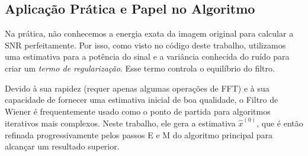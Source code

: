 \documentclass[12pt]{article}
\begin{document}
\subsection{Aplicação Prática e Papel no Algoritmo}

Na prática, não conhecemos a energia exata da imagem original para calcular a SNR perfeitamente. Por isso, como visto no código deste trabalho, utilizamos uma estimativa para a potência do sinal e a variância conhecida do ruído para criar um \textit{termo de regularização}. Esse termo controla o equilíbrio do filtro.

Devido à sua rapidez (requer apenas algumas operações de FFT) e à sua capacidade de fornecer uma estimativa inicial de boa qualidade, o Filtro de Wiener é frequentemente usado como o ponto de partida para algoritmos iterativos mais complexos. Neste trabalho, ele gera a estimativa $\hat{x}^{(0)}$, que é então refinada progressivamente pelos passos E e M do algoritmo principal para alcançar um resultado superior.
\end{document}
